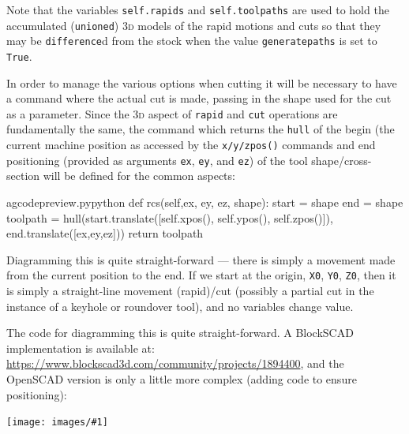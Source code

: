 \documentclass{ltxdoc}
\newcommand{\includeimage}[1]{\bigskip\noindent\texttt{[image: images/\#1]}\bigskip}
\begin{document}
Note that the variables \verb|self.rapids| and \verb|self.toolpaths| are used to hold the accumulated (\verb|unioned|) \textsc{3d} models of the rapid motions and cuts so that they may be \verb|difference|d from the stock when the value \verb|generatepaths| is set to \verb|True|.

In order to manage the various options when cutting it will be necessary to have a command where the actual cut is made, passing in the shape used for the cut as a parameter. Since the \textsc{3d} aspect of \verb|rapid| and \verb|cut| operations are fundamentally the same, the command  which returns the \verb|hull| of the begin (the current machine position as accessed by the \verb|x/y/zpos()| commands and end positioning (provided as arguments \verb|ex|, \verb|ey|, and \verb|ez|) of the tool shape/cross-section will be defined for the common aspects:

\lstset{firstnumber=\thegcpy}
\begin{writecode}{a}{gcodepreview.py}{python}
    def rcs(self,ex, ey, ez, shape):
        start = shape
        end = shape
        toolpath = hull(start.translate([self.xpos(), self.ypos(), self.zpos()]),
                        end.translate([ex,ey,ez]))
        return toolpath

\end{writecode}
\addtocounter{gcpy}{7}

Diagramming this is quite straight-forward --- there is simply a movement made from the current position to the end. If we start at the origin, \verb|X0|, \verb|Y0|, \verb|Z0|, then it is simply a straight-line movement (rapid)/cut (possibly a partial cut in the instance of a keyhole or roundover tool), and no variables change value.

The code for diagramming this is quite straight-forward. A BlockSCAD implementation is available at: \url{https://www.blockscad3d.com/community/projects/1894400}, and the OpenSCAD version is only a little more complex (adding code to ensure positioning):

\includeimage{gcp_statemachine_0_0_0_50_25_-10.png}%
\end{document}
